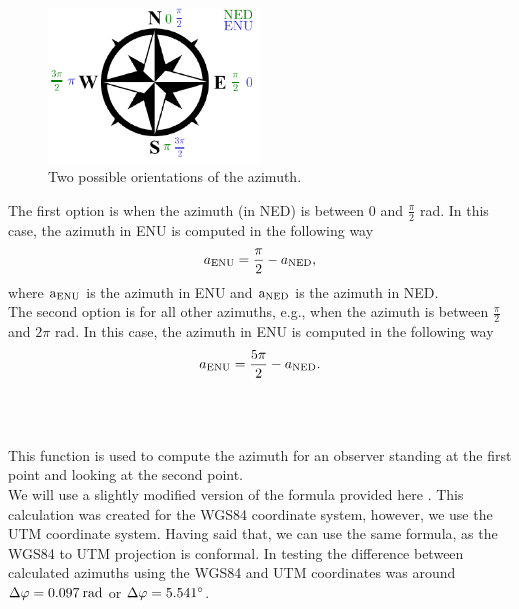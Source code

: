             \begin{figure}[ht]
                \centering
                \includegraphics[width=0.5\textwidth]{images/direction_indicator.pdf}
                \caption{Two possible orientations of the azimuth.}
                \label{fig:dir_indi}
            \end{figure}
            \noindent The first option is when the azimuth (in NED) is between 0 and $\frac{\pi}{2}$ rad. In this case, the azimuth in ENU is computed in the following way
            \begin{equation}
                a_{\rm{ENU}} = \frac{\pi}{2} - a_{\rm{NED}},
            \end{equation}
            where $\text{a}_{\rm{ENU}}$ is the azimuth in ENU and $\text{a}_{\rm{NED}}$ is the azimuth in NED.\\
            The second option is for all other azimuths, e.g., when the azimuth is between $\frac{\pi}{2}$ and $2\pi$ rad. In this case, the azimuth in ENU is computed in the following way
            \begin{equation}
                a_{\rm{ENU}} = \frac{5\pi}{2} - a_{\rm{NED}}.
            \end{equation}\\\\
        \\
            This function is used to compute the azimuth for an observer standing at the first point and looking at the second point.\\
            We will use a slightly modified version of the formula provided here \cite{calc_bearing}. This calculation was created for the WGS84 coordinate system, however, we use the UTM coordinate system. Having said that, we can use the same formula, as the WGS84 to UTM projection is conformal\cite{Map_projections}. In testing the difference between calculated azimuths using the WGS84 and UTM coordinates was around $\Delta\varphi=0.097\:\rm{rad}$ or $\Delta\varphi=5.541\rm{^{\circ}}$.\\
